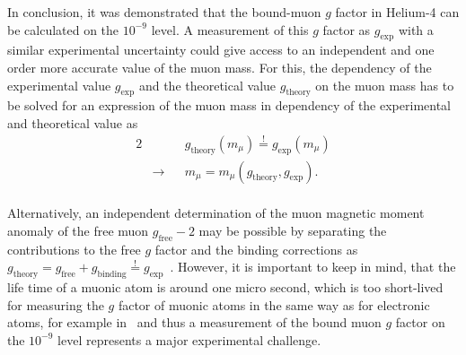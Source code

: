 In conclusion, it was demonstrated that the bound-muon $g$ factor in Helium-4 can be calculated on the $10^{-9}$ level. A measurement of this $g$ factor as $g_{\text{exp}}$ with a similar experimental uncertainty could give access to an independent and one order more accurate value of the muon mass. For this, the dependency of the experimental value $g_{\text{exp}}$ and the theoretical value $g_{\text{theory}}$ on the muon mass has to be solved for an expression of the muon mass in dependency of the experimental and theoretical value as\\
\begin{alignat}{2}
&&&g_{\text{theory}}(m_\mu)\overset{!}{=}g_{\text{exp}}(m_\mu)\\
&\rightarrow &&m_\mu=m_\mu (g_{\text{theory}},g_{\text{exp}}).
\end{alignat}\\
 Alternatively, an independent determination of the muon magnetic moment anomaly of the free muon $g_{\text{free}}-2$ may be possible by separating the  contributions to the free $g$ factor and the binding corrections as $g_{\text{theory}}=g_{\text{free}}+g_{\text{binding}}\overset{!}{=}g_{\text{exp}}$~\cite{sikora2018}.
However, it is important to keep in mind, that the life time of a muonic atom is around one micro second, which is too short-lived for measuring the $g$ factor of muonic atoms in the same way as for electronic atoms, for example in~\cite{Sturm2011,Sturm2014} and thus a measurement of the bound muon $g$ factor on the $10^{-9}$ level represents a major experimental challenge.
%
%
